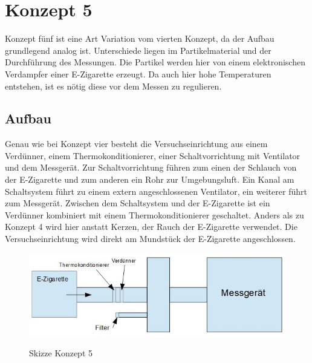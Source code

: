 \section{Konzept 5}
Konzept f\"{u}nf ist eine Art Variation vom vierten Konzept, da der Aufbau grundlegend analog ist. Unterschiede liegen im Partikelmaterial und der Durchf\"{u}hrung des Messungen. Die Partikel werden hier von einem elektronischen Verdampfer einer E-Zigarette erzeugt. Da auch hier hohe Temperaturen entstehen, ist es n\"{o}tig diese vor dem Messen zu regulieren.

\subsection{Aufbau}
Genau wie bei Konzept vier besteht die Versuchseinrichtung aus einem Verd\"{u}nner, einem Thermokonditionierer, einer Schaltvorrichtung mit Ventilator und dem Messger\"{a}t. Zur Schaltvorrichtung f\"{u}hren zum einen der Schlauch von der E-Zigarette und zum anderen ein Rohr zur Umgebungsluft. Ein Kanal am Schaltsystem f\"{u}hrt zu einem extern angeschlossenen Ventilator, ein weiterer f\"{u}hrt zum Messger\"{a}t. Zwischen dem Schaltsystem und der E-Zigarette ist ein Verd\"{u}nner kombiniert mit einem Thermokonditionierer geschaltet. Anders als zu Konzept 4 wird hier anstatt Kerzen, der Rauch der E-Zigarette verwendet. Die Versuchseinrichtung wird direkt am Mundst\"{u}ck der E-Zigarette angeschlossen.
\begin{figure}[H]
        \myfloatalign
        {\includegraphics[width=.9\linewidth]{gfx/concepts/Konzept_5.jpg}} \quad
        \caption[Skizze Konzept 5]
        {Skizze Konzept 5}
        \label{fig:concept_5}
\end{figure}

